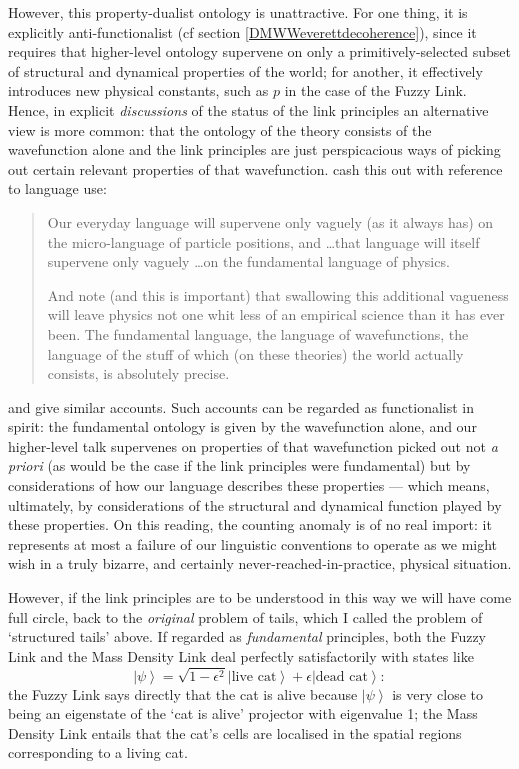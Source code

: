 \documentclass[12pt]{article}
\newcommand{\be}{\begin{equation}}
\newcommand{\ee}{\end{equation}}
\newcommand{\ket}[1]{\ensuremath{\left|  #1 \right\rangle}}
\begin{document}
However, this property-dualist ontology is unattractive. For one thing, it is explicitly anti-functionalist (cf section \ref{DMWWeverettdecoherence}), since it requires that higher-level ontology supervene on only a primitively-selected subset of structural and dynamical properties of the world; for another, it effectively introduces new physical constants, such as $p$ in the case of the Fuzzy Link. Hence, in explicit \emph{discussions} of the status of the link principles an alternative view is more common: that the ontology of the theory consists of the wavefunction alone and the link principles are just perspicacious ways of picking out certain relevant properties of that wavefunction.  cash this out with reference to language use:
\begin{quote}
Our everyday language will supervene only vaguely (as it always has) on the micro-language of particle positions, and \ldots that language will itself supervene only vaguely \ldots on the fundamental language of physics.

And note (and this is important) that swallowing this additional vagueness will leave physics not one whit less of an empirical science than it has ever been. The fundamental language, the language of wavefunctions, the language of the stuff of which (on these theories) the world actually consists, is absolutely precise. \cite[p.\,90]{albertloewer1996}
\end{quote}
 and  give similar accounts. Such accounts can be regarded as functionalist in spirit: the fundamental ontology is given by the wavefunction alone, and our higher-level talk supervenes on properties of that wavefunction picked out not \emph{a priori} (as would be the case if the link principles were fundamental) but by considerations of how our language describes these properties --- which means, ultimately, by considerations of the structural and dynamical function played by these 
properties. On this reading, the counting anomaly is  of no real import: it represents at most a failure of our linguistic conventions to operate as we might wish in a truly bizarre, and certainly never-reached-in-practice, physical situation.

However, if the link principles are to be understood in this way we will have come full circle, back to the \emph{original} problem of tails, which I called the problem of `structured tails' above. If regarded as \emph{fundamental} principles, both the Fuzzy Link and the Mass Density Link deal perfectly satisfactorily with states like
\be  \ket{\psi}=\sqrt{1-\epsilon^2}\ket{\mathrm{\mbox{live cat}}}+\epsilon\ket{\mathrm{\mbox{dead cat}}}:\ee
the Fuzzy Link says directly that the cat is alive because \ket{\psi} is very close to being an eigenstate of the `cat is alive' projector with eigenvalue 1; the Mass Density Link entails that the cat's cells are localised in the spatial regions corresponding to a living cat.
\end{document}
